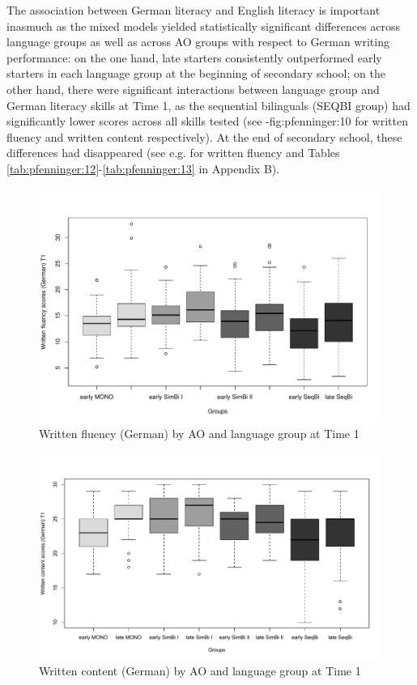 \documentclass[output=paper,modfonts,nonflat,newtxmath]{langsci/langscibook}
\begin{document}
The association between German literacy and English literacy is important inasmuch as the mixed models yielded statistically significant differences across language groups as well as across AO groups with respect to German writing performance: on the one hand, late starters consistently outperformed early starters in each language group at the beginning of secondary school; on the other hand, there were significant interactions between language group and German literacy skills at Time 1, as the sequential bilinguals (SEQBI group) had significantly lower scores across all skills tested (see -{fig:pfenninger:10} for written fluency and written content respectively). At the end of secondary school, these differences had disappeared (see e.g.  for written fluency and Tables \ref{tab:pfenninger:12}-\ref{tab:pfenninger:13} in Appendix B).%


\begin{figure}%
\includegraphics[height=.45\textheight]{figures/PfenningerFigure9.pdf}
 \caption{\label{fig:pfenninger:9}Written fluency (German) by AO and language group at Time 1}
\end{figure}


\begin{figure}%
\includegraphics[width=\textwidth]{figures/PfenningerFigure10.pdf}
\caption{\label{fig:pfenninger:10} Written content (German) by AO and language group at Time 1}
\end{figure}
\end{document}
